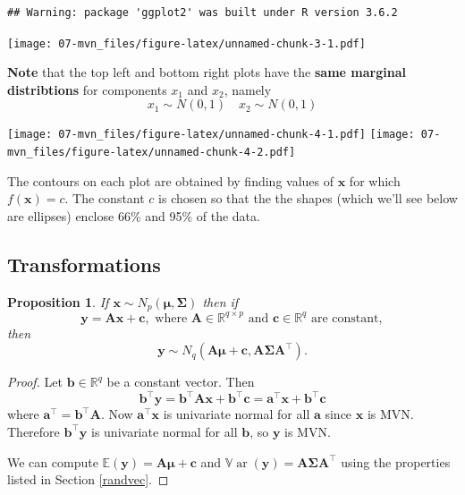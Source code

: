 \documentclass[]{book}
\newtheorem{proposition}{Proposition}[chapter]
\theoremstyle{definition}
\theoremstyle{definition}
\theoremstyle{definition}
\theoremstyle{remark}
\begin{document}
\begin{verbatim}
## Warning: package 'ggplot2' was built under R version 3.6.2
\end{verbatim}

\texttt{[image: 07-mvn\_files/figure-latex/unnamed-chunk-3-1.pdf]}

\textbf{Note} that the top left and bottom right plots have the \textbf{same marginal distribtions} for components \(x_1\) and \(x_2\), namely
\[x_1 \sim N(0, 1)\quad x_2 \sim N(0, 1)\]

\texttt{[image: 07-mvn\_files/figure-latex/unnamed-chunk-4-1.pdf]} \texttt{[image: 07-mvn\_files/figure-latex/unnamed-chunk-4-2.pdf]}

The contours on each plot are obtained by finding values of \(\mathbf x\) for which \(f(\mathbf x)=c\). The constant \(c\) is chosen so that the the shapes (which we'll see below are ellipses)
enclose 66\% and 95\% of the data.

\hypertarget{transformations}{%
\subsection{Transformations}\label{transformations}}

\begin{proposition}
\protect\hypertarget{prp:six2}{}{\label{prp:six2} } If \(\mathbf x\sim N_p({\boldsymbol{\mu}},\boldsymbol{\Sigma})\) then if \[\mathbf y= \mathbf A\mathbf x+ \mathbf c, \mbox{ where } \mathbf A\in \mathbb{R}^{q \times p} \mbox{ and }\mathbf c\in \mathbb{R}^q
  \mbox{ are constant},\] then
\[\mathbf y\sim N_q(\mathbf A{\boldsymbol{\mu}}+ \mathbf c, \mathbf A\boldsymbol{\Sigma}\mathbf A^\top).\]
\end{proposition}

\begin{proof}
{}Let \(\mathbf b\in \mathbb{R}^q\) be a constant vector. Then
\[ \mathbf b^\top \mathbf y= \mathbf b^\top \mathbf A\mathbf x+ \mathbf b^\top \mathbf c= \mathbf a^\top \mathbf x+ \mathbf b^\top \mathbf c\]
where \(\mathbf a^\top = \mathbf b^\top \mathbf A\). Now \(\mathbf a^\top \mathbf x\) is univariate normal for all \(\mathbf a\) since \(\mathbf x\) is MVN. Therefore \(\mathbf b^\top \mathbf y\) is univariate normal for all \(\mathbf b\), so \(\mathbf y\) is MVN.

We can compute \({\mathbb{E}}(\mathbf y)=\mathbf A{\boldsymbol{\mu}}+\mathbf c\) and \({\mathbb{V}\operatorname{ar}}(\mathbf y)=\mathbf A\boldsymbol{\Sigma}\mathbf A^\top\) using the properties listed in Section \ref{randvec}.
\end{proof}
\end{document}
